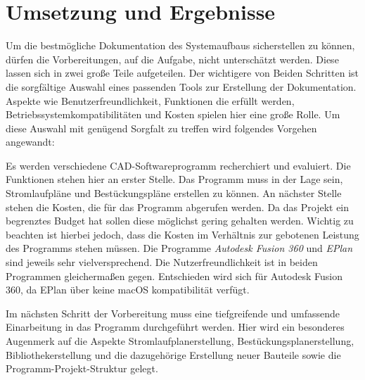 \chapter{Umsetzung und Ergebnisse}
\label{cha:umsetzung}
Um die bestmögliche Dokumentation des Systemaufbaus sicherstellen zu können, dürfen die Vorbereitungen, auf die Aufgabe, nicht unterschätzt werden. Diese lassen sich in zwei große Teile aufgeteilen. Der wichtigere von Beiden Schritten ist die sorgfältige Auswahl eines passenden Tools zur Erstellung der Dokumentation. Aspekte wie Benutzerfreundlichkeit, Funktionen die erfüllt werden, Betriebssystemkompatibilitäten und Kosten spielen hier eine große Rolle. Um diese Auswahl mit genügend Sorgfalt zu treffen wird folgendes Vorgehen angewandt:

Es werden verschiedene CAD-Softwareprogramm recherchiert und evaluiert. Die Funktionen stehen hier an erster Stelle. Das Programm muss in der Lage sein, Stromlaufpläne und Bestückungspläne erstellen zu können. An nächster Stelle stehen die Kosten, die für das Programm abgerufen werden. Da das Projekt ein begrenztes Budget hat sollen diese möglichst gering gehalten werden. Wichtig zu beachten ist hierbei jedoch, dass die Kosten im Verhältnis zur gebotenen Leistung des Programms stehen müssen. Die Programme \textit{Autodesk Fusion 360} und \textit{EPlan} sind jeweils sehr vielversprechend. Die Nutzerfreundlichkeit ist in beiden Programmen gleichermaßen gegen. Entschieden wird sich für Autodesk Fusion 360, da EPlan über keine macOS kompatibilität verfügt.

Im nächsten Schritt der Vorbereitung muss eine tiefgreifende und umfassende Einarbeitung in das Programm durchgeführt werden. Hier wird ein besonderes Augenmerk auf die Aspekte Stromlaufplanerstellung, Bestückungsplanerstellung, Bibliothekerstellung und die dazugehörige Erstellung neuer Bauteile sowie die Programm-Projekt-Struktur gelegt.



%

%

%

